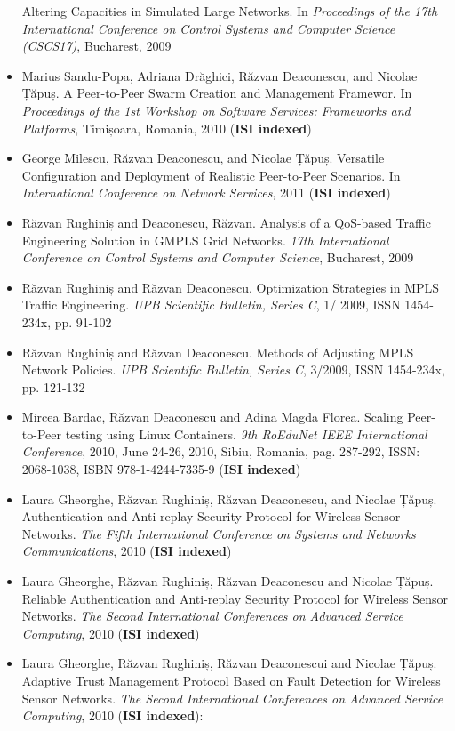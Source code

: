 \begin{itemize}
  Altering Capacities in Simulated Large Networks. In \textit{Proceedings of
  the 17th International Conference on Control Systems and Computer Science
  (CSCS17)}, Bucharest, 2009
  \item Marius Sandu-Popa, Adriana Drăghici, Răzvan Deaconescu, and Nicolae
  Țăpuș. A Peer-to-Peer Swarm Creation and Management Framewor. In
  \textit{Proceedings of the 1st Workshop on Software Services: Frameworks and
  Platforms}, Timișoara, Romania, 2010 (\textbf{ISI indexed})
  \item George Milescu, Răzvan Deaconescu, and Nicolae Țăpuș. Versatile
  Configuration and Deployment of Realistic Peer-to-Peer Scenarios. In
  \textit{International Conference on Network Services}, 2011 (\textbf{ISI
  indexed})
  \item Răzvan Rughiniș and Deaconescu, Răzvan. Analysis of a QoS-based
  Traffic Engineering Solution in GMPLS Grid Networks. \textit{17th
  International Conference on Control Systems and Computer Science},
  Bucharest, 2009
  \item Răzvan Rughiniș and Răzvan Deaconescu. Optimization Strategies in MPLS
  Traffic Engineering. \textit{UPB Scientific Bulletin, Series C}, 1/ 2009,
  ISSN 1454-234x, pp. 91-102
  \item Răzvan Rughiniș and Răzvan Deaconescu. Methods of Adjusting MPLS
  Network Policies. \textit{UPB Scientific Bulletin, Series C}, 3/2009, ISSN
  1454-234x, pp. 121-132
  \item Mircea Bardac, Răzvan Deaconescu and Adina Magda Florea. Scaling
  Peer-to-Peer testing using Linux Containers. \textit{9th RoEduNet IEEE
  International Conference}, 2010, June 24-26, 2010, Sibiu, Romania, pag.
  287-292, ISSN: 2068-1038, ISBN 978-1-4244-7335-9 (\textbf{ISI indexed})
  \item Laura Gheorghe, Răzvan Rughiniș, Răzvan Deaconescu, and Nicolae Țăpuș.
  Authentication and Anti-replay Security Protocol for Wireless Sensor
  Networks. \textit{The Fifth International Conference on Systems and Networks
  Communications}, 2010 (\textbf{ISI indexed})
  \item Laura Gheorghe, Răzvan Rughiniș, Răzvan Deaconescu and Nicolae Țăpuș.
  Reliable Authentication and Anti-replay Security Protocol for Wireless
  Sensor Networks. \textit{The Second International Conferences on Advanced
  Service Computing}, 2010 (\textbf{ISI indexed})
  \item Laura Gheorghe, Răzvan Rughiniș, Răzvan Deaconescui and Nicolae Țăpuș.
  Adaptive Trust Management Protocol Based on Fault Detection for Wireless
  Sensor Networks. \textit{The Second International Conferences on Advanced
  Service Computing}, 2010 (\textbf{ISI indexed}):
\end{itemize}

